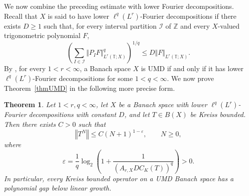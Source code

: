 \documentclass[12pt]{amsart}
\theoremstyle{plain}
\newtheorem{thm}{Theorem}[section]
\theoremstyle{remark}
\theoremstyle{definition}
\newcommand{\Z}{\mathbb{Z}}
\newcommand{\T}{\mathbb{T}}
\newcommand{\norm}[1]{\left\Vert #1\right\Vert}
\begin{document}
	We now combine the preceding estimate with lower Fourier decompositions.
	Recall that $X$ is said to have lower $\ell^q(L^r)$-Fourier decompositions
	if there exists $D\ge1$ such that, for every interval partition
	$\mathcal I$ of $\Z$ and every $X$-valued trigonometric polynomial $F$,
	\begin{equation}\label{eqLowerFourierDecomposition}
		\left(
		\sum_{I\in\mathcal I}
		\norm{P_IF}_{L^r(\T;X)}^q
		\right)^{1/q}
		\le
		D\norm{F}_{L^r(\T;X)}.
	\end{equation}
	By \cite[Theorem 2.8]{DengLoristVeraar}, for every $1<r<\infty$, a Banach
	space $X$ is UMD if and only if it has lower
	$\ell^q(L^r)$-Fourier decompositions for some $1<q<\infty$. We now prove Theorem~\ref{thmUMD} in the following more precise form.
	
	\begin{thm}\label{thmUMDPolynomialGap}
		Let $1<r,q<\infty$, let $X$ be a Banach space with lower
		$\ell^q(L^r)$-Fourier decompositions with constant $D$, and let
		$T\in B(X)$ be Kreiss bounded. Then there exists $C>0$ such that
		\[
		\norm{T^N}
		\le
		C(N+1)^{1-\varepsilon},
		\qquad N\ge0,
		\]
		where
		\[
		\varepsilon
		=
		\frac1q
		\log_2\left(
		1+\frac{1}{(A_{r,X}DC_K(T))^q}
		\right)>0.
		\]
		In particular, every Kreiss bounded operator on a UMD Banach space has a
		polynomial gap below linear growth.
	\end{thm}
	
\end{document}
